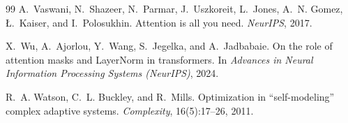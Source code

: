 \documentclass[preprint,12pt,authoryear]{elsarticle}
\begin{document}
\begin{thebibliography}{99}
A.~Vaswani, N.~Shazeer, N.~Parmar, J.~Uszkoreit, L.~Jones, A.~N. Gomez,
{\L}.~Kaiser, and I.~Polosukhin.
\newblock Attention is all you need.
\newblock \emph{NeurIPS}, 2017.

X.~Wu, A.~Ajorlou, Y.~Wang, S.~Jegelka, and A.~Jadbabaie.
\newblock On the role of attention masks and {L}ayer{N}orm in
transformers.
\newblock In \emph{Advances in Neural Information Processing Systems
(NeurIPS)}, 2024.

R.~A. Watson, C.~L. Buckley, and R.~Mills.
\newblock Optimization in ``self-modeling'' complex adaptive systems.
\newblock \emph{Complexity}, 16(5):17--26, 2011.

\end{thebibliography}
\end{document}
